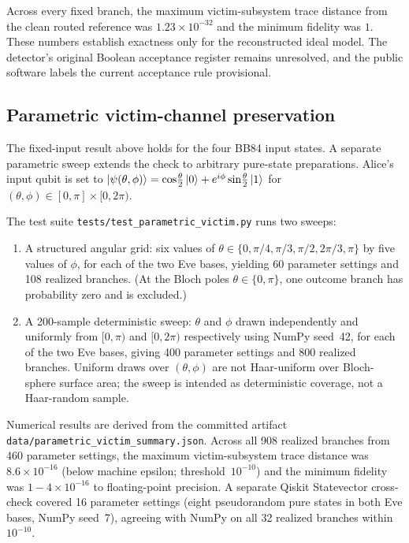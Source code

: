 Across every fixed branch, the maximum victim-subsystem trace distance from the
clean routed reference was $1.23\times10^{-32}$ and the minimum fidelity was
$1$. These numbers establish exactness only for the reconstructed ideal model.
The detector's original Boolean acceptance register remains unresolved, and the
public software labels the current acceptance rule provisional.

\subsection{Parametric victim-channel preservation}
\label{sec:parametric-victim}

The fixed-input result above holds for the four BB84 input states. A separate
parametric sweep extends the check to arbitrary pure-state preparations.
Alice's input qubit is set to
$|\psi(\theta,\phi)\rangle
= \cos\!\tfrac{\theta}{2}\ket{0}
+ e^{i\phi}\sin\!\tfrac{\theta}{2}\ket{1}$
for $(\theta,\phi) \in [0,\pi]\times[0,2\pi)$.

The test suite \texttt{tests/test\_parametric\_victim.py} runs two sweeps:
\begin{enumerate}
  \item A structured angular grid: six values of
  $\theta \in \{0, \pi/4, \pi/3, \pi/2, 2\pi/3, \pi\}$ by five values of
  $\phi$, for each of the two Eve bases, yielding 60 parameter settings
  and 108 realized branches. (At the Bloch poles $\theta\in\{0,\pi\}$,
  one outcome branch has probability zero and is excluded.)
  \item A 200-sample deterministic sweep: $\theta$ and $\phi$ drawn
  independently and uniformly from $[0,\pi)$ and $[0,2\pi)$ respectively
  using NumPy seed~42, for each of the two Eve bases, giving
  400 parameter settings and 800 realized branches. Uniform draws over
  $(\theta,\phi)$ are not Haar-uniform over Bloch-sphere surface area; the
  sweep is intended as deterministic coverage, not a Haar-random sample.
\end{enumerate}
Numerical results are derived from the committed artifact
\texttt{data/parametric\_victim\_summary.json}. Across all
908 realized branches from 460 parameter settings, the maximum
victim-subsystem trace distance was $8.6\times10^{-16}$ (below machine
epsilon; threshold~$10^{-10}$) and the minimum fidelity was $1{-}4\times10^{-16}$
to floating-point precision. A separate Qiskit Statevector cross-check
covered 16 parameter settings (eight pseudorandom pure states in both Eve
bases, NumPy seed~7), agreeing with NumPy on all 32 realized branches within
$10^{-10}$.


